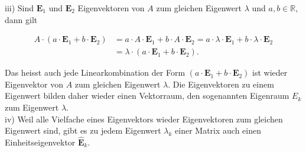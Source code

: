 \documentclass[10pt]{article}
\begin{document}
iii) Sind $\mathbf{E}_{1}$ und $\mathbf{E}_{2}$ Eigenvektoren von $A$ zum gleichen Eigenwert $\lambda$ und $a, b \in \mathbb{R}$, dann gilt


\begin{align*}
A \cdot\left(a \cdot \mathbf{E}_{1}+b \cdot \mathbf{E}_{2}\right) & =a \cdot A \cdot \mathbf{E}_{1}+b \cdot A \cdot \mathbf{E}_{2}=a \cdot \lambda \cdot \mathbf{E}_{1}+b \cdot \lambda \cdot \mathbf{E}_{2} \\
& =\lambda \cdot\left(a \cdot \mathbf{E}_{1}+b \cdot \mathbf{E}_{2}\right) . \tag{6.155}
\end{align*}


Das heisst auch jede Linearkombination der Form $\left(a \cdot \mathbf{E}_{1}+b \cdot \mathbf{E}_{2}\right)$ ist wieder Eigenvektor von $A$ zum gleichen Eigenwert $\lambda$. Die Eigenvektoren zu einem Eigenwert bilden daher wieder einen Vektorraum, den sogenannten Eigenraum $E_{k}$ zum Eigenwert $\lambda$.\\
iv) Weil alle Vielfache eines Eigenvektors wieder Eigenvektoren zum gleichen Eigenwert sind, gibt es zu jedem Eigenwert $\lambda_{k}$ einer Matrix auch einen Einheitseigenvektor $\hat{\mathbf{E}}_{k}$.
\end{document}
